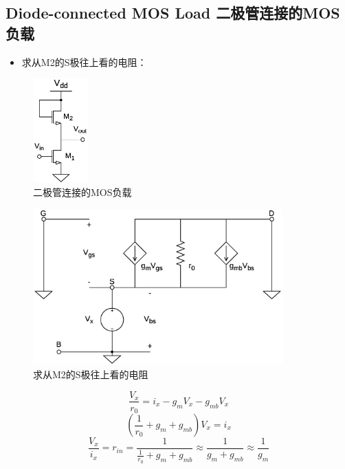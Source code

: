 \documentclass[twoside,a4paper,openright,titlepage,draft]{ctexrep}
\begin{document}
\subsection{Diode-connected MOS Load 二极管连接的MOS负载\\}
\begin{multicols}{2}
    \begin{itemize}
        \item 求从M2的S极往上看的电阻：
    \end{itemize}
    \columnbreak
    \begin{figure}[H]
        \centering
        \includegraphics[height=40mm]{diode-connectedload.eps}
        \caption{二极管连接的MOS负载}
        \label{fig:二级管连接的MOS负载}
    \end{figure}
\end{multicols}

\begin{figure}[H]
    \centering
    \includegraphics[height=60mm]{sourceimpedence.eps}
    \caption{求从M2的S极往上看的电阻}
    \label{fig:求从M2的S极往上看的电阻}
\end{figure}        

\begin{equation}
    \frac{V_x}{r_0} = i_x - g_mV_x - g_{mb}V_x
\end{equation}
\begin{equation}
    (\frac{1}{r_0} + g_m + g_{mb})V_x = i_x
\end{equation}
\begin{equation}
    \frac{V_x}{i_x} = r_{in} = \frac{1}{\frac{1}{r_0} + g_m + g_{mb}}
    \approx \frac{1}{g_m + g_{mb}} \approx \frac{1}{g_m}
\end{equation}
\end{document}
